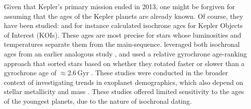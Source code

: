 \documentclass[11pt,twocolumn,tighten]{aastex63}
\begin{document}
Given that Kepler's primary mission ended in 2013, one might be
forgiven for assuming that the ages of the Kepler planets are already
known.  Of course, they have been studied: \citet{Berger_2020b_rpage}
and \citet{Petigura_2022} for instance calculated isochrone ages for
Kepler Objects of Interest (KOIs).  These ages are most precise for
stars whose luminosities and temperatures separate them from the
main-sequence.  \citet{David_2021} leveraged both isochronal ages from
an earlier analogous study \citep{Fulton_Petigura_2018_cks_vii}, and
used a relative gyrochrone age-ranking approach that sorted stars
based on whether they rotated faster or slower than a gyrochrone age
of $\approx$2.6\,Gyr \citep{Meibom_2015,Curtis_2020}.  These studies
were conducted in the broader context of investigating trends in
exoplanet demographics, which also depend on stellar metallicity and
mass \citep[e.g.][]{Petigura_2018}.  These studies offered limited
sensitivity to the ages of the youngest planets, due to the nature of
isochronal dating.
\end{document}

